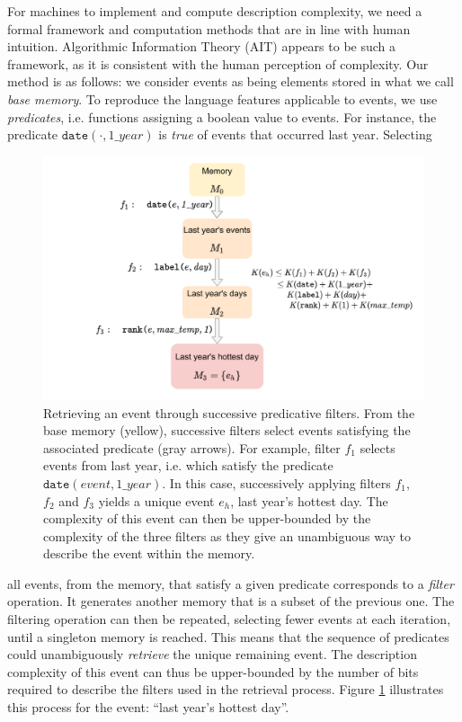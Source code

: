 \documentclass[entropy,article,submit,moreauthors,pdftex]{Definitions/mdpi}
\begin{document}
For machines to implement and compute description complexity, we need a formal framework and computation methods that are in line with human intuition.  Algorithmic Information Theory (AIT) appears to be such a framework, as it is consistent with the human perception of complexity\cite{li_introduction_2008,dessalles2011coincidences,delahaye_numerical_2012}. Our method is as follows: we
consider events as being elements stored in what we call \emph{base memory}. To
reproduce the language features applicable to events, we use \emph
{predicates}, i.e. functions assigning a boolean value to events. For instance, the predicate $\mathtt{date}
(\cdot, 1\_year)$ is \emph{true} of events that occurred last year. Selecting
\begin{figure}[hb]
    \centering
    \includegraphics[width=.95\linewidth]{figures/filters}
    \caption{Retrieving an event through successive predicative
        filters. From the base memory (yellow), successive filters select events satisfying the associated predicate (gray arrows). For example,
        filter $f_1$ selects events from last year, i.e. which satisfy the
        predicate $\mathtt{date}(event, 1\_year)$. In this case, successively
        applying filters $f_1$, $f_2$ and $f_3$ yields a unique event $e_h$, last
        year's hottest day. The complexity of this event can then be upper-bounded
        by the complexity of the three filters as they give an unambiguous way
        to describe the event within the memory.}
    \label{fig:filters}
\end{figure}
all events, from the memory, that satisfy a given predicate corresponds to
a \emph{filter} operation. It generates another memory that is a subset of the previous one.
The filtering operation can then be repeated, selecting
fewer events at each iteration, until a singleton memory is reached. This means that the sequence
of predicates could unambiguously \emph{retrieve} the unique remaining event.
The description complexity of this event can thus be upper-bounded by the
number of bits required to describe the filters used in the retrieval
process. Figure \ref{fig:filters} illustrates this process for the event: ``last year's hottest day''.
\end{document}
